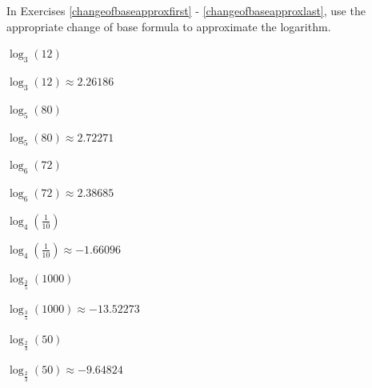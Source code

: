 \documentclass{ximera}
\begin{document}
\begin{question}
    
In Exercises \ref{changeofbaseapproxfirst} - \ref{changeofbaseapproxlast}, use the appropriate change of base formula to approximate the logarithm.

\begin{problem}\label{changeofbaseapproxfirst}
    $\log_{3}(12)$

    \begin{solution}
        $\log_{3}(12) \approx 2.26186$
    \end{solution}
\end{problem}

\begin{problem}
    $\log_{5}(80)$

\begin{solution}
$\log_{5}(80) \approx 2.72271$
\end{solution}
\end{problem}

\begin{problem}
    $\log_{6}(72)$

    \begin{solution}
        $\log_{6}(72) \approx 2.38685$
    \end{solution}
\end{problem}

\begin{problem}
    $\log_{4}\left(\frac{1}{10}\right)$

\begin{solution}
$\log_{4}\left(\frac{1}{10}\right) \approx -1.66096$
\end{solution}
\end{problem}

\begin{problem}
     $\log_{\frac{3}{5}}(1000)$ 

     \begin{solution}
          $\log_{\frac{3}{5}}(1000) \approx -13.52273$
     \end{solution}
\end{problem}

\begin{problem}\label{changeofbaseapproxlast}
    $\log_{\frac{2}{3}}(50)$

\begin{solution}
$\log_{\frac{2}{3}}(50) \approx -9.64824$
\end{solution}
\end{problem}

\end{question}
\end{document}
